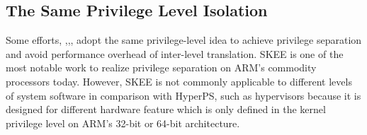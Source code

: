﻿\documentclass[conference]{IEEEtran}
\begin{document}
\subsection{The Same Privilege Level Isolation}
Some efforts, 
\cite{Azab2016SKEE},\cite{Wang2015SecPod},\cite{Deng2017Dancing}, adopt the same privilege-level idea to achieve privilege separation and avoid performance overhead of inter-level translation.
SKEE\cite{Azab2016SKEE} is one of the most notable work to realize privilege separation on ARM's commodity processors today. 
However, SKEE is not commonly applicable to different levels of system software in comparison with HyperPS, such as hypervisors because it is designed for different hardware feature which is only defined in the kernel privilege level on ARM's 32-bit or 64-bit architecture.
\end{document}
